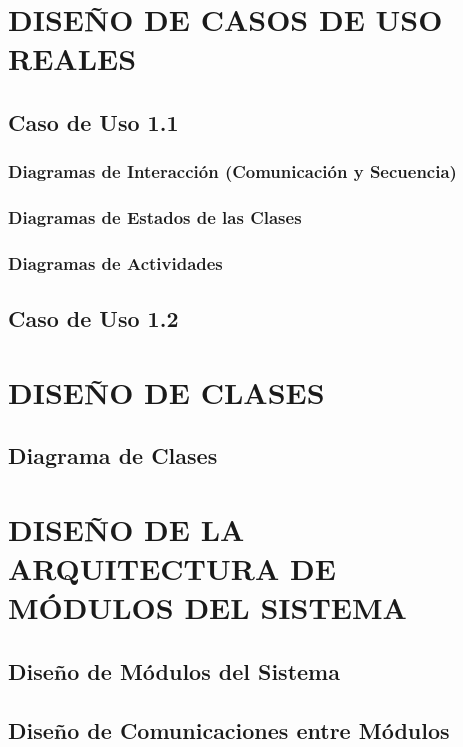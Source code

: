 \documentclass[11pt]{report}
\begin{document}
\newpage


\section{DISEÑO DE CASOS DE USO REALES}

\subsection{Caso de Uso 1.1} 

\subsubsection{Diagramas de Interacción (Comunicación y Secuencia)} 

\subsubsection{Diagramas de Estados de las Clases} 
 
\subsubsection{Diagramas de Actividades} 


\subsection{Caso de Uso 1.2}


\newpage
\section{DISEÑO DE CLASES}

\subsection{Diagrama de Clases}


\newpage
\section{DISEÑO DE LA ARQUITECTURA DE MÓDULOS DEL SISTEMA}

\subsection{Diseño de Módulos del Sistema}

\subsection{Diseño de Comunicaciones entre Módulos}
\end{document}
